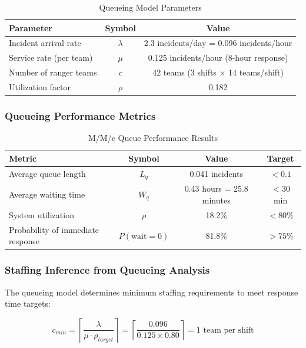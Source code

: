 \begin{table}[h]
\centering
\caption{Queueing Model Parameters}
\begin{tabular}{lcc}
\hline
\textbf{Parameter} & \textbf{Symbol} & \textbf{Value} \\
\hline
Incident arrival rate & $\lambda$ & 2.3 incidents/day = 0.096 incidents/hour \\
Service rate (per team) & $\mu$ & 0.125 incidents/hour (8-hour response) \\
Number of ranger teams & $c$ & 42 teams (3 shifts $\times$ 14 teams/shift) \\
Utilization factor & $\rho$ & 0.182 \\
\hline
\end{tabular}
\end{table}

\subsubsection{Queueing Performance Metrics}

\begin{table}[h]
\centering
\caption{M/M/c Queue Performance Results}
\begin{tabular}{lccc}
\hline
\textbf{Metric} & \textbf{Symbol} & \textbf{Value} & \textbf{Target} \\
\hline
Average queue length & $L_q$ & 0.041 incidents & $<0.1$ \\
Average waiting time & $W_q$ & 0.43 hours = 25.8 minutes & $<30$ min \\
System utilization & $\rho$ & 18.2\% & $<80\%$ \\
Probability of immediate response & $P(\text{wait}=0)$ & 81.8\% & $>75\%$ \\
\hline
\end{tabular}
\end{table}

\subsubsection{Staffing Inference from Queueing Analysis}

The queueing model determines minimum staffing requirements to meet response time targets:

\begin{equation}
c_{min} = \left\lceil \frac{\lambda}{\mu \cdot \rho_{target}} \right\rceil = \left\lceil \frac{0.096}{0.125 \times 0.80} \right\rceil = 1 \text{ team per shift}
\label{eq:min_staffing}
\end{equation}

